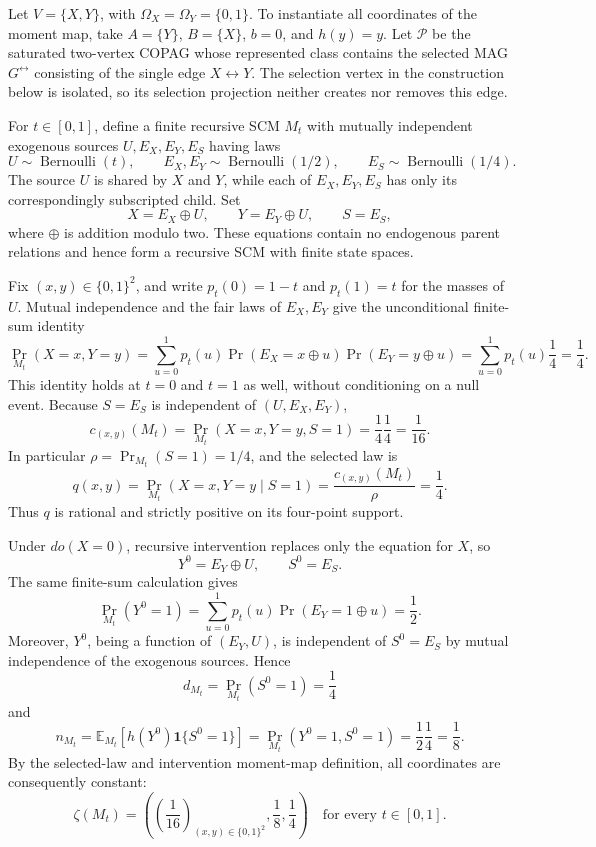 Let \(V=\{X,Y\}\), with \(\Omega_X=\Omega_Y=\{0,1\}\).  To instantiate all coordinates of the moment map, take \(A=\{Y\}\), \(B=\{X\}\), \(b=0\), and \(h(y)=y\).  Let \(\mathcal P\) be the saturated two-vertex COPAG whose represented class contains the selected MAG \(G^{\leftrightarrow}\) consisting of the single edge \(X\leftrightarrow Y\).  The selection vertex in the construction below is isolated, so its selection projection neither creates nor removes this edge.

For \(t\in[0,1]\), define a finite recursive SCM \(M_t\) with mutually independent exogenous sources \(U,E_X,E_Y,E_S\) having laws
\[
 U\sim\operatorname{Bernoulli}(t),\qquad
 E_X,E_Y\sim\operatorname{Bernoulli}(1/2),\qquad
 E_S\sim\operatorname{Bernoulli}(1/4).
\]
The source \(U\) is shared by \(X\) and \(Y\), while each of \(E_X,E_Y,E_S\) has only its correspondingly subscripted child.  Set
\[
 X=E_X\oplus U,\qquad Y=E_Y\oplus U,\qquad S=E_S,
\]
where \(\oplus\) is addition modulo two.  These equations contain no endogenous parent relations and hence form a recursive SCM with finite state spaces.

Fix \((x,y)\in\{0,1\}^2\), and write \(p_t(0)=1-t\) and \(p_t(1)=t\) for the masses of \(U\).  Mutual independence and the fair laws of \(E_X,E_Y\) give the unconditional finite-sum identity
\[
 \Pr_{M_t}(X=x,Y=y)
 =\sum_{u=0}^1 p_t(u)\Pr(E_X=x\oplus u)\Pr(E_Y=y\oplus u)
 =\sum_{u=0}^1p_t(u)\frac14=\frac14.
\]
This identity holds at \(t=0\) and \(t=1\) as well, without conditioning on a null event.  Because \(S=E_S\) is independent of \((U,E_X,E_Y)\),
\[
 c_{(x,y)}(M_t)
 =\Pr_{M_t}(X=x,Y=y,S=1)
 =\frac14\frac14=\frac1{16}.
\]
In particular \(\rho=\Pr_{M_t}(S=1)=1/4\), and the selected law is
\[
 q(x,y)=\Pr_{M_t}(X=x,Y=y\mid S=1)
 =\frac{c_{(x,y)}(M_t)}{\rho}=\frac14.
\]
Thus \(q\) is rational and strictly positive on its four-point support.

Under \(do(X=0)\), recursive intervention replaces only the equation for \(X\), so
\[
 Y^0=E_Y\oplus U,\qquad S^0=E_S.
\]
The same finite-sum calculation gives
\[
 \Pr_{M_t}(Y^0=1)=\sum_{u=0}^1p_t(u)\Pr(E_Y=1\oplus u)=\frac12.
\]
Moreover, \(Y^0\), being a function of \((E_Y,U)\), is independent of \(S^0=E_S\) by mutual independence of the exogenous sources.  Hence
\[
 d_{M_t}=\Pr_{M_t}(S^0=1)=\frac14
\]
and
\[
 n_{M_t}
 =\mathbb E_{M_t}\!\left[h(Y^0)\mathbf 1\{S^0=1\}\right]
 =\Pr_{M_t}(Y^0=1,S^0=1)
 =\frac12\frac14=\frac18.
\]
By the selected-law and intervention moment-map definition, all coordinates are consequently constant:
\[
 \zeta(M_t)
 =\left(\left(\frac1{16}\right)_{(x,y)\in\{0,1\}^2},\frac18,\frac14\right)
 \quad\text{for every }t\in[0,1].
\]

